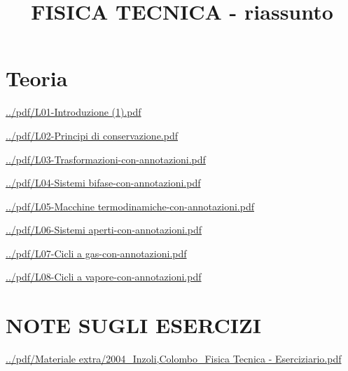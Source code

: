 \documentclass[a4paper, 9pt]{article}
\title{FISICA TECNICA - riassunto}
\begin{document}
    \maketitle
    \tableofcontents{}
    \newpage
    \part{Teoria}
    \newpage
    \url{../pdf/L01-Introduzione (1).pdf}
    
    \newpage
    \url{../pdf/L02-Principi di conservazione.pdf}
    
    \newpage
    \url{../pdf/L03-Trasformazioni-con-annotazioni.pdf}
    
    \newpage
    \url{../pdf/L04-Sistemi bifase-con-annotazioni.pdf}
    
    \newpage
    \url{../pdf/L05-Macchine termodinamiche-con-annotazioni.pdf}
    
    \newpage
    \url{../pdf/L06-Sistemi aperti-con-annotazioni.pdf}
    
    \newpage
    \url{../pdf/L07-Cicli a gas-con-annotazioni.pdf}
    
    \newpage
    \url{../pdf/L08-Cicli a vapore-con-annotazioni.pdf}
    
    \newpage
    \part{NOTE SUGLI ESERCIZI}
    \newpage
    \url{../pdf/Materiale extra/2004_Inzoli,Colombo_Fisica Tecnica - Eserciziario.pdf}
    
\end{document}
